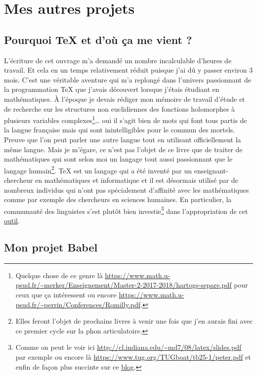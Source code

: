\chapter{Mes autres projets}\label{chap:projets}

\section{Pourquoi \TeX{} et d'où ça me vient ?}\label{sec:tex}

L'écriture de cet ouvrage m'a demandé un nombre incalculable d'heures
de travail. Et cela en un temps relativement réduit puisque j'ai dû y
passer environ 3 mois. C'est une véritable aventure qui m'a replongé
dans l'univers passionnant de la programmation \TeX{} que j'avais
découvert lorsque j'étais étudiant en mathématiques. À l'époque je
devais rédiger mon mémoire de travail d'étude et de recherche sur les
structures non euclidiennes des fonctions holomorphes à plusieurs
variables complexes\footnote{Quelque chose de ce genre là
  \url{https://www.math.u-psud.fr/~merker/Enseignement/Master-2-2017-2018/hartogs-separe.pdf}
pour ceux que ça intéressent ou encore \url{https://www.math.u-psud.fr/~perrin/Conferences/Romilly.pdf}.}\dots{} oui il s'agit bien de mots qui font tous partis de la
langue française mais qui sont inintelligibles pour le commun des
mortels. Preuve que l'on peut parler une autre langue tout en
utilisant officiellement la même langue. Mais je m'égare, ce n'est pas
l'objet de ce livre que de traiter de mathématiques qui sont selon moi
un langage tout aussi passionnant que le langage humain\footnote{Elles
feront l'objet de prochains livres à venir une fois que j'en aurais
fini avec ce premier cycle sur la \gls{phon} articulatoire.}. \TeX{}
est un langage qui a été inventé par un enseignant-chercheur en
mathématiques et informatique et il est désormais utilisé par de
nombreux individus qui n'ont pas spécialement d'affinité avec les
mathématiques comme par exemple des chercheurs en sciences
humaines. En particulier, la communauté des linguistes s'est plutôt
bien investie\footnote{Comme on peut le voir ici
  \url{http://cl.indiana.edu/~md7/08/latex/slides.pdf} par exemple ou
  encore là \url{https://www.tug.org/TUGboat/tb25-1/peter.pdf} et
  enfin de façon plus succinte sur ce \href{https://allthingslinguistic.com/post/50042310246/what-is-latex-and-why-do-linguists-love-it}{blog}.} dans l'appropriation de cet \href{http://stefanocoretta.altervista.org/xelatex-linguistics/}{outil}.

\section{Mon projet Babel}\label{sec:babel}

